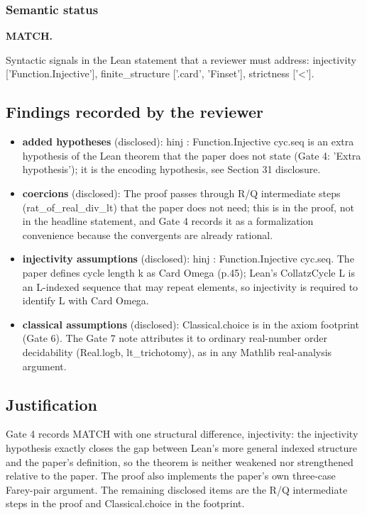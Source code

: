 \documentclass[11pt]{article}
\begin{document}
\subsubsection*{Semantic status}
\textbf{MATCH.}


Syntactic signals in the Lean statement that a reviewer must address: injectivity ['Function.Injective'], finite\_structure ['.card', 'Finset'], strictness ['<'].
\subsection*{Findings recorded by the reviewer}
\begin{itemize}
\item \textbf{added hypotheses} (disclosed): hinj : Function.Injective cyc.seq is an extra hypothesis of the Lean theorem that the paper does not state (Gate 4: 'Extra hypothesis'); it is the encoding hypothesis, see Section 31 disclosure.
\item \textbf{coercions} (disclosed): The proof passes through R/Q intermediate steps (rat\_of\_real\_div\_lt) that the paper does not need; this is in the proof, not in the headline statement, and Gate 4 records it as a formalization convenience because the convergents are already rational.
\item \textbf{injectivity assumptions} (disclosed): hinj : Function.Injective cyc.seq. The paper defines cycle length k as Card Omega (p.45); Lean's CollatzCycle L is an L-indexed sequence that may repeat elements, so injectivity is required to identify L with Card Omega.
\item \textbf{classical assumptions} (disclosed): Classical.choice is in the axiom footprint (Gate 6). The Gate 7 note attributes it to ordinary real-number order decidability (Real.logb, lt\_trichotomy), as in any Mathlib real-analysis argument.
\end{itemize}
\subsection*{Justification}
Gate 4 records MATCH with one structural difference, injectivity: the injectivity hypothesis exactly closes the gap between Lean's more general indexed structure and the paper's definition, so the theorem is neither weakened nor strengthened relative to the paper. The proof also implements the paper's own three-case Farey-pair argument. The remaining disclosed items are the R/Q intermediate steps in the proof and Classical.choice in the footprint.
\end{document}
